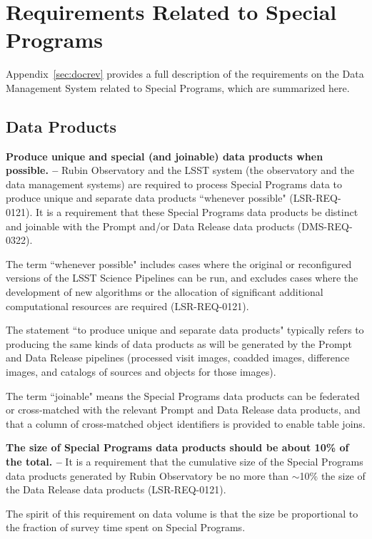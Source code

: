 \section{Requirements Related to Special Programs}\label{sec:req}

Appendix~\ref{sec:docrev} provides a full description of the requirements 
on the Data Management System related to Special Programs, which are summarized here.

\subsection{Data Products}\label{ssec:req_dp}

\textbf{Produce unique and special (and joinable) data products when possible. --}
Rubin Observatory and the LSST system (the observatory and the data 
management systems) are required to process Special Programs data to 
produce unique and separate data products ``whenever possible" 
(LSR-REQ-0121).
It is a requirement that these Special Programs data products be distinct 
and joinable with the Prompt and/or Data Release data products (DMS-REQ-0322).

The term ``whenever possible" includes cases where the original or 
reconfigured versions of the LSST Science Pipelines can be run, and 
excludes cases where the development of new algorithms or the allocation 
of significant additional computational resources are required 
(LSR-REQ-0121).

The statement ``to produce unique and separate data products" typically 
refers to producing the same kinds of data products as will be generated 
by the Prompt and Data Release pipelines (processed visit images, coadded 
images, difference images, and catalogs of sources and objects for those 
images).

The term ``joinable" means the Special Programs data products can be federated 
or cross-matched with the relevant Prompt and Data Release data products, and that
a column of cross-matched object identifiers is provided to enable table joins.

\textbf{The size of Special Programs data products should be about 10\% of the total. --}
It is a requirement that the cumulative size of the Special Programs data 
products generated by Rubin Observatory be no more than $\sim$10\% the 
size of the Data Release data products (LSR-REQ-0121).

The spirit of this requirement on data volume is that the size be proportional to the fraction 
of survey time spent on Special Programs.

